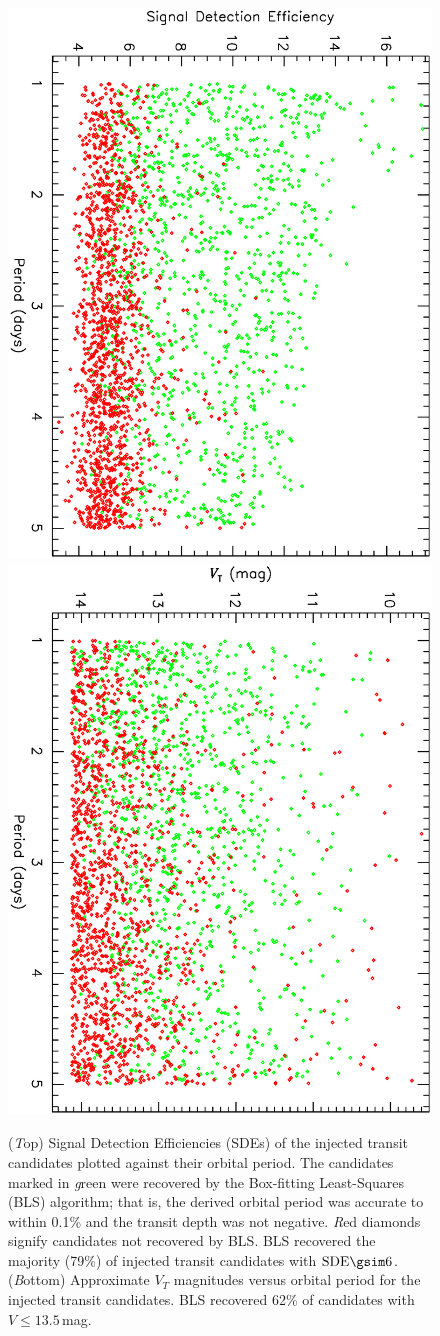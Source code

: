 \begin{figure}
\begin{center}
\centering
\includegraphics[width=.55\textwidth, angle=90]{7_comp_b} \\
\includegraphics[width=.55\textwidth, angle=90]{7_comp_a} \\
\caption[SDE and $V_{T}$ versus period for BLS-recovered transits]{%
({\textit Top}) Signal Detection Efficiencies (SDEs) of the injected transit candidates plotted against their orbital period.
The candidates marked in {\textit green} were recovered by the Box-fitting Least-Squares (BLS) algorithm; that is, the derived orbital period was accurate to within 0.1\% and the transit depth was not negative.
{\textit Red diamonds} signify candidates not recovered by BLS.
BLS recovered the majority (79\%) of injected transit candidates with $\mathrm{SDE}\gsim6$.
({\textit Bottom}) Approximate $V_{T}$ magnitudes versus orbital period for the injected transit candidates.
BLS recovered 62\% of candidates with $V\leq13.5$\,mag.%
}\label{cha:human:sec:model:fig:rec}
\end{center}
\end{figure}

